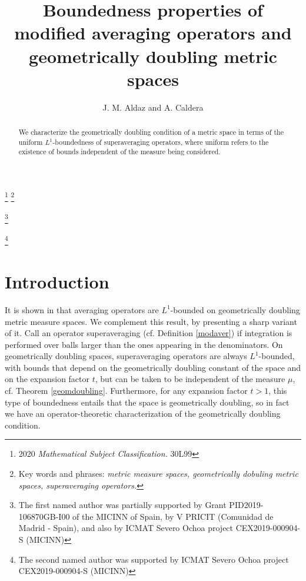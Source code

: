 \documentclass[12pt]{amsart}
\theoremstyle{definition}
\theoremstyle{parrafo}
\begin{document}
\author{J. M. Aldaz and A. Caldera}
\address{Instituto de Ciencias Matem\'aticas (CSIC-UAM-UC3M-UCM) and Departamento de 
Mate\-m\'aticas,
Universidad  Aut\'onoma de Madrid, Cantoblanco 28049, Madrid, Spain.}
\address{Departamento de Mate\-m\'aticas, Universidad de Oviedo, 33007, Oviedo, Spain}

\thanks{2020 {\em Mathematical Subject Classification.} 30L99}
\thanks{Key words and phrases: \emph{metric measure spaces, geometrically dobuling metric spaces, superaveraging operators.}}

\thanks{The first named author was partially supported by Grant PID2019-106870GB-I00 of the
MICINN of Spain, by  V PRICIT (Comunidad de Madrid - Spain), and also  by ICMAT Severo Ochoa project 
CEX2019-000904-S (MICINN)}

\thanks{The second named author was supported by ICMAT Severo Ochoa project 
	CEX2019-000904-S (MICINN)}




	
	\title[]{Boundedness properties of modified averaging operators and geometrically doubling metric spaces}

	
	\maketitle
	
	

\begin{abstract} We characterize the geometrically doubling condition of a metric space in
terms of the  uniform $L^1$-boundedness of superaveraging operators, where uniform refers to the
existence of bounds independent of the measure being considered.
\end{abstract}


	
	
\section {Introduction} 
	It is shown in  \cite{Al1} that averaging operators are  $L^1$-bounded on geometrically doubling metric measure spaces. We complement this result,  by presenting 
 a sharp variant of it.
 Call an operator superaveraging (cf. Definition \ref{modaver})
 if integration is performed over balls larger than the ones appearing in the denominators. On geometrically doubling spaces, superaveraging operators are always $L^1$-bounded, with bounds that depend on the geometrically doubling constant of the space and on the expansion factor $t$, but can be taken to be independent of the measure $\mu$, cf. Theorem \ref{geomdoubling}. Furthermore, for any expansion factor $t  > 1$, this type of boundedness entails that the space is geometrically doubling, so 
 in fact we have an operator-theoretic characterization of the geometrically doubling condition.
				
\end{document}
